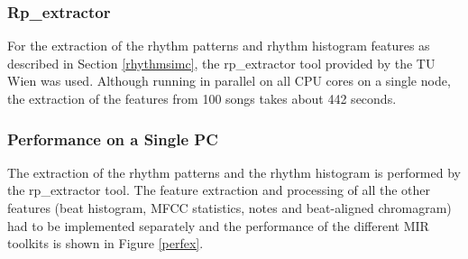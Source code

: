\subsubsection{Rp\_extractor}

For the extraction of the rhythm patterns and rhythm histogram features as described in Section \ref{rhythmsimc}, the rp\_extractor tool provided by the TU Wien was used. Although running in parallel on all CPU cores on a single node, the extraction of the features from 100 songs takes about 442 seconds.

\subsubsection{Performance on a Single PC}

The extraction of the rhythm patterns and the rhythm histogram is performed by the rp\_extractor tool. The feature extraction and processing of all the other features (beat histogram, MFCC statistics, notes and beat-aligned chromagram) had to be implemented separately and the performance of the different MIR toolkits is shown in Figure \ref{perfex}. 

